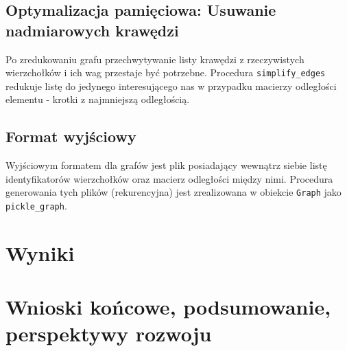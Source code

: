 \documentclass[a4paper,10pt]{article}
\begin{document}
\subsection{Optymalizacja pamięciowa: Usuwanie nadmiarowych krawędzi}

Po zredukowaniu grafu przechwytywanie listy krawędzi z rzeczywistych wierzchołków i ich wag przestaje być potrzebne. Procedura \texttt{simplify\_edges} redukuje listę do jedynego interesującego nas w przypadku macierzy odległości elementu - krotki z najmniejszą odległością.

\subsection{Format wyjściowy}

Wyjściowym formatem dla grafów jest plik posiadający wewnątrz siebie listę identyfikatorów wierzchołków oraz macierz odległości między nimi. Procedura generowania tych plików (rekurencyjna) jest zrealizowana w obiekcie \texttt{Graph} jako \texttt{pickle\_graph}.

\section{Wyniki}
\section{Wnioski końcowe, podsumowanie, perspektywy rozwoju}
  
\end{document}
